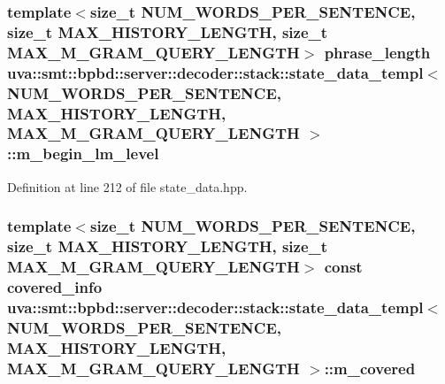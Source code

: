 \subsubsection[{m\+\_\+begin\+\_\+lm\+\_\+level}]{\setlength{\rightskip}{0pt plus 5cm}template$<$size\+\_\+t N\+U\+M\+\_\+\+W\+O\+R\+D\+S\+\_\+\+P\+E\+R\+\_\+\+S\+E\+N\+T\+E\+N\+C\+E, size\+\_\+t M\+A\+X\+\_\+\+H\+I\+S\+T\+O\+R\+Y\+\_\+\+L\+E\+N\+G\+T\+H, size\+\_\+t M\+A\+X\+\_\+\+M\+\_\+\+G\+R\+A\+M\+\_\+\+Q\+U\+E\+R\+Y\+\_\+\+L\+E\+N\+G\+T\+H$>$ {\bf phrase\+\_\+length} {\bf uva\+::smt\+::bpbd\+::server\+::decoder\+::stack\+::state\+\_\+data\+\_\+templ}$<$ N\+U\+M\+\_\+\+W\+O\+R\+D\+S\+\_\+\+P\+E\+R\+\_\+\+S\+E\+N\+T\+E\+N\+C\+E, M\+A\+X\+\_\+\+H\+I\+S\+T\+O\+R\+Y\+\_\+\+L\+E\+N\+G\+T\+H, M\+A\+X\+\_\+\+M\+\_\+\+G\+R\+A\+M\+\_\+\+Q\+U\+E\+R\+Y\+\_\+\+L\+E\+N\+G\+T\+H $>$\+::m\+\_\+begin\+\_\+lm\+\_\+level}\label{structuva_1_1smt_1_1bpbd_1_1server_1_1decoder_1_1stack_1_1state__data__templ_a5ce4e872dc3a3d34b3b92470112ac516}


Definition at line 212 of file state\+\_\+data.\+hpp.

\hypertarget{structuva_1_1smt_1_1bpbd_1_1server_1_1decoder_1_1stack_1_1state__data__templ_a5483ddf5862e4c020020b49f889a53c8}{}
\subsubsection[{m\+\_\+covered}]{\setlength{\rightskip}{0pt plus 5cm}template$<$size\+\_\+t N\+U\+M\+\_\+\+W\+O\+R\+D\+S\+\_\+\+P\+E\+R\+\_\+\+S\+E\+N\+T\+E\+N\+C\+E, size\+\_\+t M\+A\+X\+\_\+\+H\+I\+S\+T\+O\+R\+Y\+\_\+\+L\+E\+N\+G\+T\+H, size\+\_\+t M\+A\+X\+\_\+\+M\+\_\+\+G\+R\+A\+M\+\_\+\+Q\+U\+E\+R\+Y\+\_\+\+L\+E\+N\+G\+T\+H$>$ const {\bf covered\+\_\+info} {\bf uva\+::smt\+::bpbd\+::server\+::decoder\+::stack\+::state\+\_\+data\+\_\+templ}$<$ N\+U\+M\+\_\+\+W\+O\+R\+D\+S\+\_\+\+P\+E\+R\+\_\+\+S\+E\+N\+T\+E\+N\+C\+E, M\+A\+X\+\_\+\+H\+I\+S\+T\+O\+R\+Y\+\_\+\+L\+E\+N\+G\+T\+H, M\+A\+X\+\_\+\+M\+\_\+\+G\+R\+A\+M\+\_\+\+Q\+U\+E\+R\+Y\+\_\+\+L\+E\+N\+G\+T\+H $>$\+::m\+\_\+covered}\label{structuva_1_1smt_1_1bpbd_1_1server_1_1decoder_1_1stack_1_1state__data__templ_a5483ddf5862e4c020020b49f889a53c8}


